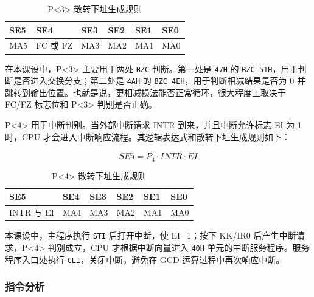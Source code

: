 \documentclass[UTF8,12pt,a4paper]{ctexart}
\newcommand{\hex}[1]{\texttt{#1H}}
\newcommand{\inst}[1]{\texttt{#1}}
\begin{document}
\begin{table}[H]
\centering
\caption{P<3> 散转下址生成规则}
\label{tab:p3-rule}
\renewcommand{\arraystretch}{1.25}
\begin{tabular}{|>{\centering\arraybackslash}p{1.9cm}
                |>{\centering\arraybackslash}p{2.4cm}
                |>{\centering\arraybackslash}p{1.9cm}
                |>{\centering\arraybackslash}p{1.9cm}
                |>{\centering\arraybackslash}p{1.9cm}
                |>{\centering\arraybackslash}p{1.9cm}|}
\hline
SE5 & SE4 & SE3 & SE2 & SE1 & SE0 \\
\hline
MA5 & FC 或 FZ & MA3 & MA2 & MA1 & MA0 \\
\hline
\end{tabular}
\end{table}

在本课设中，P<3> 主要用于两处 \inst{BZC} 判断。第一处是 \hex{47} 的 \inst{BZC 51H}，用于判断是否进入交换分支；第二处是 \hex{4A} 的 \inst{BZC 4EH}，用于判断相减结果是否为 0 并跳转到输出位置。也就是说，更相减损法能否正常循环，很大程度上取决于 FC/FZ 标志位和 P<3> 判别是否正确。

P<4> 用于中断判别。当外部中断请求 INTR 到来，并且中断允许标志 EI 为 1 时，CPU 才会进入中断响应流程。其逻辑表达式和散转下址生成规则如下：

\[
SE5=\overline{P_4}\cdot INTR \cdot EI
\]

\begin{table}[H]
\centering
\caption{P<4> 散转下址生成规则}
\label{tab:p4-rule}
\renewcommand{\arraystretch}{1.25}
\begin{tabular}{|>{\centering\arraybackslash}p{2.4cm}
                |>{\centering\arraybackslash}p{1.8cm}
                |>{\centering\arraybackslash}p{1.8cm}
                |>{\centering\arraybackslash}p{1.8cm}
                |>{\centering\arraybackslash}p{1.8cm}
                |>{\centering\arraybackslash}p{1.8cm}|}
\hline
SE5 & SE4 & SE3 & SE2 & SE1 & SE0 \\
\hline
INTR 与 EI & MA4 & MA3 & MA2 & MA1 & MA0 \\
\hline
\end{tabular}
\end{table}

本课设中，主程序执行 \inst{STI} 后打开中断，使 EI=1；按下 KK/IR0 后产生中断请求，P<4> 判别成立，CPU 才根据中断向量进入 \hex{40} 单元的中断服务程序。服务程序入口处执行 \inst{CLI}，关闭中断，避免在 GCD 运算过程中再次响应中断。

\subsubsection{指令分析}
\end{document}
